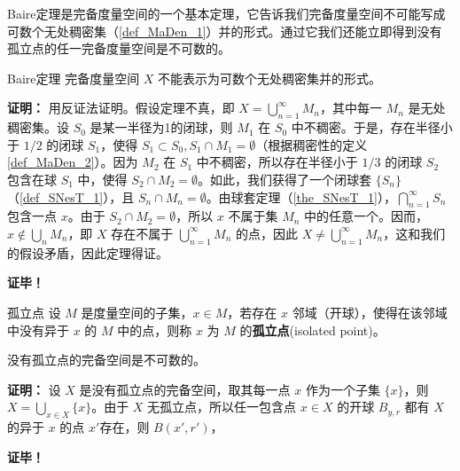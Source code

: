 
Baire定理是完备度量空间的一个基本定理，它告诉我们完备度量空间不可能写成可数个无处稠密集（\autoref{def_MaDen_1}）并的形式。通过它我们还能立即得到没有孤立点的任一完备度量空间是不可数的。

\begin{theorem}{Baire定理}
完备度量空间 $X$ 不能表示为可数个无处稠密集并的形式。
\end{theorem}
\textbf{证明：}
用反证法证明。假设定理不真，即 $X=\bigcup_{n=1}^\infty M_n$，其中每一 $M_n$ 是无处稠密集。设 $S_0$ 是某一半径为1的闭球，则 $M_1$ 在 $S_0$ 中不稠密。于是，存在半径小于 $1/2$ 的闭球 $S_1$，使得 $S_1\subset S_0,S_1\cap M_1=\emptyset$（根据稠密性的定义\autoref{def_MaDen_2}）。因为 $M_2$ 在 $S_1$ 中不稠密，所以存在半径小于 $1/3$ 的闭球 $S_2$ 包含在球 $S_1$ 中，使得 $S_2\cap M_2=\emptyset$。如此，我们获得了一个闭球套 $\{S_n\}$ （\autoref{def_SNesT_1}），且 $S_n\cap M_n=\emptyset$。由球套定理（\autoref{the_SNesT_1}），$\bigcap_{n=1}^\infty S_n$ 包含一点 $x$。由于 $S_2\cap M_2=\emptyset$，所以 $x$ 不属于集 $M_n$ 中的任意一个。因而，$x\notin \bigcup\limits_n M_n$，即 $X$ 存在不属于 $\bigcup_{n=1}^\infty M_n$ 的点，因此 $X\neq\bigcup_{n=1}^\infty M_n$，这和我们的假设矛盾，因此定理得证。

\textbf{证毕！}


\begin{definition}{孤立点}
设 $M$ 是度量空间的子集，$x\in M$，若存在 $x$ 邻域（开球），使得在该邻域中没有异于 $x$ 的 $M$ 中的点，则称 $x$ 为 $M$ 的\textbf{孤立点}(isolated point)。
\end{definition}

\begin{corollary}{}
没有孤立点的完备空间是不可数的。
\end{corollary}

\textbf{证明：}
设 $X$ 是没有孤立点的完备空间，取其每一点 $x$ 作为一个子集 $\{x\}$，则 $X=\bigcup\limits_{x\in X}\{x\}$。由于 $X$ 无孤立点，所以任一包含点 $x\in X$ 的开球 $B_{y,r}$ 都有 $X$ 的异于 $x$ 的点 $x'$存在，则 $B(x',r')$，


\textbf{证毕！}




